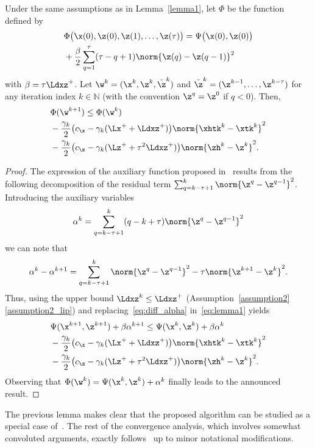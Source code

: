\begin{lemma} \label{lemma2}
Under the same assumptions as in Lemma~\ref{lemma1}, let $\Phi$ be the function defined by
%
\begin{align}
&\Phi \bigl( \x(0),\z(0),\z(1),\dotsc,\z(\tau) \bigr) = \Psi\bigl( \x(0),\z(0) \bigr) \nonumber \\
& + \frac{\beta}{2} \sum_{q = 1}^\tau (\tau - q + 1) \norm{\z(q) - \z(q-1)}^2
\end{align}
%
with $\beta = \tau \Ldxz^+$.
%
Let $\w^k = (\x^k,\z^k,\check{\z}^k)$ and $\check{\z}^k = (\z^{k-1},\dotsc,\z^{k-\tau})$ for any iteration index $k \in \mathbb{N}$ (with the convention $\z^{q} = \z^0$ if $q < 0$). Then,
%
\begin{align} \label{eq:eq_lemma2}
& \Phi(\w^{k+1}) \leq \Phi(\w^k) \nonumber \\
& - \frac{\gamma_k}{2} \bigl( c_{\x} - \gamma_k (\Lx^+ + \Ldxz^+) \bigr) \norm{\xhtk^k - \xtk^k}^2  \nonumber\\
& - \frac{\gamma_k}{2} \bigl(c_{\z} - \gamma_k (\Lz^+ + \tau^2 \Ldxz^+ ) \bigr) \norm{\zh^k - \z^k}^2 .
\end{align}
\end{lemma}
\begin{proof}
The expression of the auxiliary function proposed in~\cite{Davis2016} results from the following decomposition of the residual term $\sum_{q = k - \tau + 1}^k \norm{\z^q - \z^{q-1}}^2$. Introducing the auxiliary variables
\begin{equation*}
\alpha^k = \sum_{q = k-\tau+1}^k (q - k + \tau) \norm{\z^q - \z^{q - 1}}^2
\end{equation*}
%
we can note that
\begin{equation} \label{eq:diff_alpha}
\alpha^k - \alpha^{k+1} = \sum_{q = k-\tau+1}^k \norm{\z^q - \z^{q - 1}}^2 - \tau \norm{\z^{k+1} - \z^k}^2.
\end{equation}
%
Thus, using the upper bound $\Ldxz^k \leq \Ldxz^+$ (Assumption~\ref{assumption2}\ref{assumption2_lip}) and replacing~\eqref{eq:diff_alpha} in~\eqref{eq:lemma1} yields
%
\begin{align*}
& \Psi(\x^{k+1},\z^{k+1}) + \beta \alpha^{k+1}\leq \Psi(\x^k,\z^k) + \beta \alpha^k \\
& - \frac{\gamma_k}{2} \bigl( c_\x - \gamma_k (\Lx^+ + \Ldxz^+) \bigr) \norm{\xhtk^k - \xtk^k}^2  \nonumber\\
& - \frac{\gamma_k}{2} \bigl(c_{\z} - \gamma_k (\Lz^+ + \tau^2 \Ldxz^+ ) \bigr) \norm{\zh^k - \z^k}^2.
\end{align*}
%
Observing that $\Phi(\w^k) = \Psi(\x^{k},\z^{k}) + \alpha^{k}$ finally leads to the announced result.
\end{proof}

The previous lemma makes clear that the proposed algorithm can be studied as a special case of~\cite{Cannelli2016}. The rest of the convergence analysis, which involves somewhat convoluted arguments, exactly follows~\cite{Cannelli2016} up to minor notational modifications.
